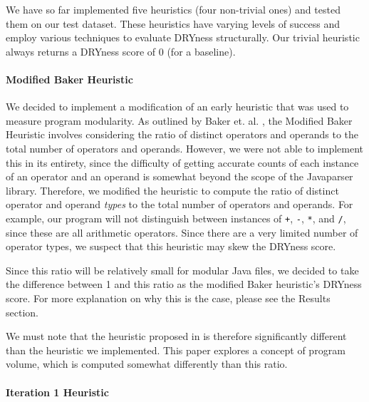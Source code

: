 \documentclass{article}
\begin{document}
We have so far implemented five heuristics (four non-trivial ones) and tested them on our test dataset. These heuristics have varying levels of success
and employ various techniques to evaluate DRYness structurally. Our trivial heuristic always returns a DRYness score of 0 (for a
baseline).

\paragraph{Modified Baker Heuristic}
We decided to implement a modification of an early heuristic that was used to measure program modularity.
As outlined by Baker et. al. \cite{Baker1979}, the Modified Baker Heuristic involves considering the ratio of distinct operators and operands to the total number of operators and operands. However, we were not able to implement this in its entirety, since the difficulty
of getting accurate counts of each instance of an operator and an operand is somewhat beyond the scope of the Javaparser library.
Therefore, we modified the heuristic to compute the ratio of distinct operator and operand \textit{types} to the total number of
operators and operands. For example, our program will not distinguish between instances of \texttt{+}, \texttt{-}, \texttt{*}, and \texttt{/}, since these are all arithmetic operators. Since there are a very limited number of operator types, we suspect that this
heuristic may skew the DRYness score.

Since this ratio will be relatively small for modular Java files, we decided to take the difference between 1 and this ratio as the modified Baker heuristic's DRYness score. For more explanation on why this is the case, please see the Results section.

We must note that the heuristic proposed in \cite{Baker1979} is therefore significantly different than the heuristic we implemented.
This paper explores a concept of program volume, which is computed somewhat differently than this ratio.

\paragraph{Iteration 1 Heuristic}
\end{document}
